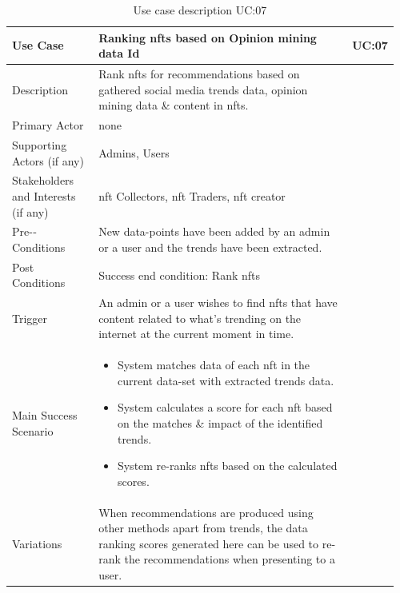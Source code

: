 \vspace{-4mm}
\begin{longtable}{|p{0.23\linewidth}|p{0.73\linewidth}|}
\caption{Use case description UC:07}\\ 
\hline
Use Case & Ranking \gls{nft}s based on Opinion mining data \endfirsthead 
\hline
Id & UC:07 \\ 
\hline
Description & Rank \gls{nft}s for recommendations based on gathered social media trends data, opinion mining data \& content in \gls{nft}s. \\ 
\hline
Primary Actor & none \\ 
\hline
Supporting Actors (if any) & Admins, Users \\ 
\hline
Stakeholders and Interests (if any) & \gls{nft} Collectors, \gls{nft} Traders, \gls{nft} creator \\ 
\hline
Pre-‐Conditions & New data-points have been added by an admin or a user and the trends have been extracted. \\ 
\hline
Post Conditions & Success end condition: Rank \gls{nft}s \\ 
\hline
Trigger & An admin or a user wishes to find \gls{nft}s that have content related to what's trending on the internet at the current moment in time. \\ 
\hline
Main Success Scenario & 
\vspace{-7mm}       %
\begin{itemize}[leftmargin=*]
    \item System matches data of each \gls{nft} in the current data-set with extracted trends data.
    \item System calculates a score for each \gls{nft} based on the matches \& impact of the identified trends.
    \item System re-ranks \gls{nft}s based on the calculated scores.
\end{itemize}
\vspace{-7mm}       %
\\ 
\hline
Variations & When recommendations are produced using other methods apart from trends, the data ranking scores generated here can be used to re-rank the recommendations when presenting to a user. \\
\hline
\end{longtable}


